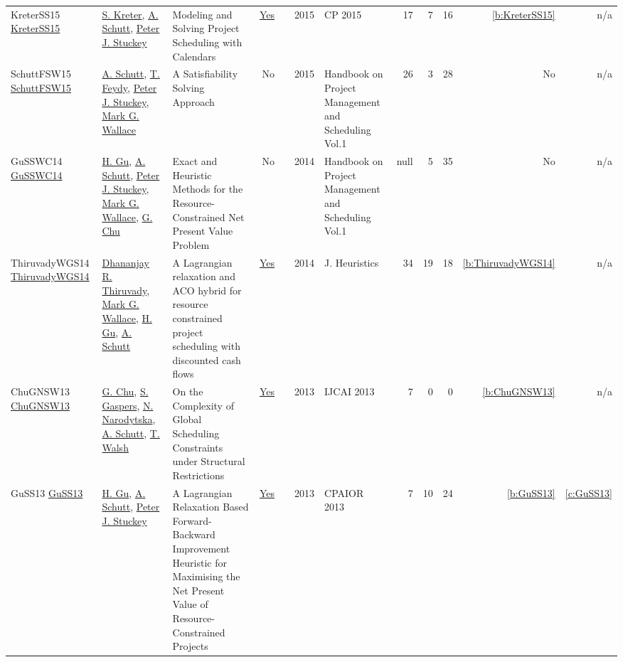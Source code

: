 {\begin{longtable}{>{\raggedright\arraybackslash}p{3cm}>{\raggedright\arraybackslash}p{6cm}>{\raggedright\arraybackslash}p{6.5cm}rrrp{2.5cm}rrrrr}
KreterSS15 \href{https://doi.org/10.1007/978-3-319-23219-5_19}{KreterSS15} & \hyperref[auth:a124]{S. Kreter}, \hyperref[auth:a125]{A. Schutt}, \hyperref[auth:a126]{Peter J. Stuckey} & Modeling and Solving Project Scheduling with Calendars & \href{../works/KreterSS15.pdf}{Yes} & \cite{KreterSS15} & 2015 & CP 2015 & 17 & 7 & 16 & \ref{b:KreterSS15} & n/a\\
SchuttFSW15 \href{https://doi.org/10.1007/978-3-319-05443-8_7}{SchuttFSW15} & \hyperref[auth:a125]{A. Schutt}, \hyperref[auth:a155]{T. Feydy}, \hyperref[auth:a126]{Peter J. Stuckey}, \hyperref[auth:a117]{Mark G. Wallace} & A Satisfiability Solving Approach & No & \cite{SchuttFSW15} & 2015 & Handbook on Project Management and Scheduling Vol.1 & 26 & 3 & 28 & No & n/a\\
GuSSWC14 \href{http://dx.doi.org/10.1007/978-3-319-05443-8_14}{GuSSWC14} & \hyperref[auth:a339]{H. Gu}, \hyperref[auth:a125]{A. Schutt}, \hyperref[auth:a126]{Peter J. Stuckey}, \hyperref[auth:a117]{Mark G. Wallace}, \hyperref[auth:a346]{G. Chu} & Exact and Heuristic Methods for the Resource-Constrained Net Present Value Problem & No & \cite{GuSSWC14} & 2014 & Handbook on Project Management and Scheduling Vol.1 & null & 5 & 35 & No & n/a\\
ThiruvadyWGS14 \href{https://doi.org/10.1007/s10732-014-9260-3}{ThiruvadyWGS14} & \hyperref[auth:a399]{Dhananjay R. Thiruvady}, \hyperref[auth:a117]{Mark G. Wallace}, \hyperref[auth:a339]{H. Gu}, \hyperref[auth:a125]{A. Schutt} & A Lagrangian relaxation and {ACO} hybrid for resource constrained project scheduling with discounted cash flows & \href{../works/ThiruvadyWGS14.pdf}{Yes} & \cite{ThiruvadyWGS14} & 2014 & J. Heuristics & 34 & 19 & 18 & \ref{b:ThiruvadyWGS14} & n/a\\
ChuGNSW13 \href{http://www.aaai.org/ocs/index.php/IJCAI/IJCAI13/paper/view/6878}{ChuGNSW13} & \hyperref[auth:a346]{G. Chu}, \hyperref[auth:a799]{S. Gaspers}, \hyperref[auth:a800]{N. Narodytska}, \hyperref[auth:a125]{A. Schutt}, \hyperref[auth:a278]{T. Walsh} & On the Complexity of Global Scheduling Constraints under Structural Restrictions & \href{../works/ChuGNSW13.pdf}{Yes} & \cite{ChuGNSW13} & 2013 & IJCAI 2013 & 7 & 0 & 0 & \ref{b:ChuGNSW13} & n/a\\
GuSS13 \href{https://doi.org/10.1007/978-3-642-38171-3_24}{GuSS13} & \hyperref[auth:a339]{H. Gu}, \hyperref[auth:a125]{A. Schutt}, \hyperref[auth:a126]{Peter J. Stuckey} & A Lagrangian Relaxation Based Forward-Backward Improvement Heuristic for Maximising the Net Present Value of Resource-Constrained Projects & \href{../works/GuSS13.pdf}{Yes} & \cite{GuSS13} & 2013 & CPAIOR 2013 & 7 & 10 & 24 & \ref{b:GuSS13} & \ref{c:GuSS13}\\

\end{longtable}}
